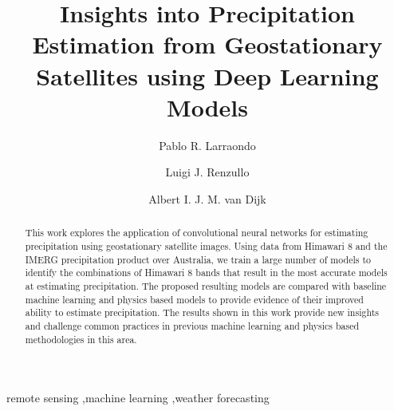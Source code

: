 \documentclass[3p,times]{elsarticle}
\begin{document}
\begin{frontmatter}



\dochead{}

\title{Insights into Precipitation Estimation from Geostationary Satellites using Deep Learning Models}


\author[1]{Pablo R. Larraondo}
\author[1]{Luigi J. Renzullo}
\author[1]{Albert I. J. M. van Dijk}

\address[1]{Fenner School of Environment and Society. Australian National University. Canberra, Australia}

\begin{abstract}
This work explores the application of convolutional neural networks for estimating precipitation using geostationary satellite images. Using data from Himawari 8 and the IMERG precipitation product over Australia, we train a large number of models to identify the combinations of Himawari 8 bands that result in the most accurate models at estimating precipitation. The proposed resulting models are compared with baseline machine learning and physics based models to provide evidence of their improved ability to estimate precipitation. The results shown in this work provide new insights and challenge common practices in previous machine learning and physics based methodologies in this area.
\end{abstract}

\begin{keyword}
remote sensing \sep machine learning \sep weather forecasting

\end{keyword}

\end{frontmatter}
\end{document}
